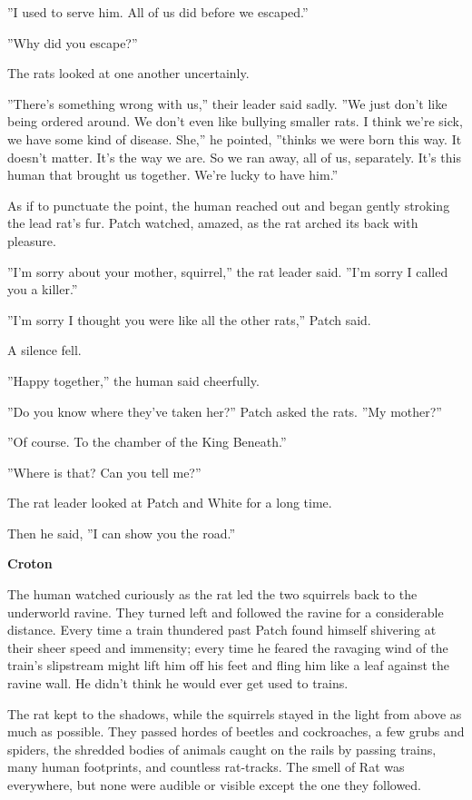 \documentclass[11pt]{article}
\begin{document}
 ''I used to serve him. All of us did before we escaped.''\par
 ''Why did you escape?''\par
 The rats looked at one another uncertainly.\par
 ''There's something wrong with us,'' their leader said sadly. ''We just don't like being ordered around. We don't even like bullying smaller rats. I think we're sick, we have some kind of disease. She,'' he pointed, ''thinks we were born this way. It doesn't matter. It's the way we are. So we ran away, all of us, separately. It's this human that brought us together. We're lucky to have him.''\par
 As if to punctuate the point, the human reached out and began gently stroking the lead rat's fur. Patch watched, amazed, as the rat arched its back with pleasure.\par
 ''I'm sorry about your mother, squirrel,'' the rat leader said. ''I'm sorry I called you a killer.''\par
 ''I'm sorry I thought you were like all the other rats,'' Patch said.\par
 A silence fell.\par
 ''Happy together,'' the human said cheerfully.\par
 ''Do you know where they've taken her?'' Patch asked the rats. ''My mother?''\par
 ''Of course. To the chamber of the King Beneath.''\par
 ''Where is that? Can you tell me?''\par
 The rat leader looked at Patch and White for a long time.\par
 Then he said, ''I can show you the road.''\par
\par
{\bf Croton\par
}\par
 The human watched curiously as the rat led the two squirrels back to the underworld ravine. They turned left and followed the ravine for a considerable distance. Every time a train thundered past Patch found himself shivering at their sheer speed and immensity; every time he feared the ravaging wind of the train's slipstream might lift him off his feet and fling him like a leaf against the ravine wall. He didn't think he would ever get used to trains.\par
 The rat kept to the shadows, while the squirrels stayed in the light from above as much as possible. They passed hordes of beetles and cockroaches, a few grubs and spiders, the shredded bodies of animals caught on the rails by passing trains, many human footprints, and countless rat-tracks. The smell of Rat was everywhere, but none were audible or visible except the one they followed.\par
\end{document}
